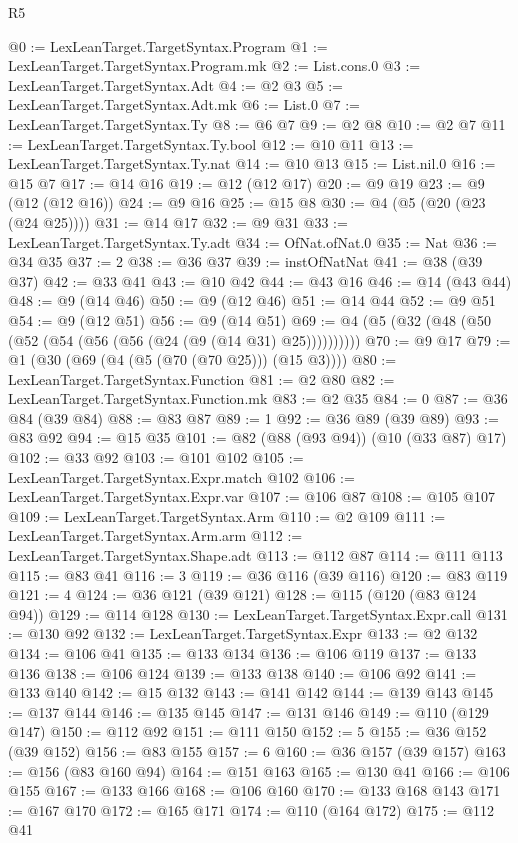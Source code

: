 \begin{lexlean}{R5}
\begin{coremodule}
@0 := LexLeanTarget.TargetSyntax.Program
@1 := LexLeanTarget.TargetSyntax.Program.mk
@2 := List.cons.{0}
@3 := LexLeanTarget.TargetSyntax.Adt
@4 := @2 @3
@5 := LexLeanTarget.TargetSyntax.Adt.mk
@6 := List.{0}
@7 := LexLeanTarget.TargetSyntax.Ty
@8 := @6 @7
@9 := @2 @8
@10 := @2 @7
@11 := LexLeanTarget.TargetSyntax.Ty.bool
@12 := @10 @11
@13 := LexLeanTarget.TargetSyntax.Ty.nat
@14 := @10 @13
@15 := List.nil.{0}
@16 := @15 @7
@17 := @14 @16
@19 := @12 (@12 @17)
@20 := @9 @19
@23 := @9 (@12 (@12 @16))
@24 := @9 @16
@25 := @15 @8
@30 := @4 (@5 (@20 (@23 (@24 @25))))
@31 := @14 @17
@32 := @9 @31
@33 := LexLeanTarget.TargetSyntax.Ty.adt
@34 := OfNat.ofNat.{0}
@35 := Nat
@36 := @34 @35
@37 := 2
@38 := @36 @37
@39 := instOfNatNat
@41 := @38 (@39 @37)
@42 := @33 @41
@43 := @10 @42
@44 := @43 @16
@46 := @14 (@43 @44)
@48 := @9 (@14 @46)
@50 := @9 (@12 @46)
@51 := @14 @44
@52 := @9 @51
@54 := @9 (@12 @51)
@56 := @9 (@14 @51)
@69 := @4 (@5 (@32 (@48 (@50 (@52 (@54 (@56 (@56 (@24 (@9 (@14 @31) @25))))))))))
@70 := @9 @17
@79 := @1 (@30 (@69 (@4 (@5 (@70 (@70 @25))) (@15 @3))))
@80 := LexLeanTarget.TargetSyntax.Function
@81 := @2 @80
@82 := LexLeanTarget.TargetSyntax.Function.mk
@83 := @2 @35
@84 := 0
@87 := @36 @84 (@39 @84)
@88 := @83 @87
@89 := 1
@92 := @36 @89 (@39 @89)
@93 := @83 @92
@94 := @15 @35
@101 := @82 (@88 (@93 @94)) (@10 (@33 @87) @17)
@102 := @33 @92
@103 := @101 @102
@105 := LexLeanTarget.TargetSyntax.Expr.match @102
@106 := LexLeanTarget.TargetSyntax.Expr.var
@107 := @106 @87
@108 := @105 @107
@109 := LexLeanTarget.TargetSyntax.Arm
@110 := @2 @109
@111 := LexLeanTarget.TargetSyntax.Arm.arm
@112 := LexLeanTarget.TargetSyntax.Shape.adt
@113 := @112 @87
@114 := @111 @113
@115 := @83 @41
@116 := 3
@119 := @36 @116 (@39 @116)
@120 := @83 @119
@121 := 4
@124 := @36 @121 (@39 @121)
@128 := @115 (@120 (@83 @124 @94))
@129 := @114 @128
@130 := LexLeanTarget.TargetSyntax.Expr.call
@131 := @130 @92
@132 := LexLeanTarget.TargetSyntax.Expr
@133 := @2 @132
@134 := @106 @41
@135 := @133 @134
@136 := @106 @119
@137 := @133 @136
@138 := @106 @124
@139 := @133 @138
@140 := @106 @92
@141 := @133 @140
@142 := @15 @132
@143 := @141 @142
@144 := @139 @143
@145 := @137 @144
@146 := @135 @145
@147 := @131 @146
@149 := @110 (@129 @147)
@150 := @112 @92
@151 := @111 @150
@152 := 5
@155 := @36 @152 (@39 @152)
@156 := @83 @155
@157 := 6
@160 := @36 @157 (@39 @157)
@163 := @156 (@83 @160 @94)
@164 := @151 @163
@165 := @130 @41
@166 := @106 @155
@167 := @133 @166
@168 := @106 @160
@170 := @133 @168 @143
@171 := @167 @170
@172 := @165 @171
@174 := @110 (@164 @172)
@175 := @112 @41

\end{coremodule}
\end{lexlean}
